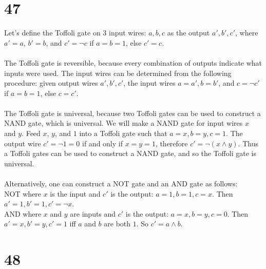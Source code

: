 \documentclass[letterpaper,notitlepage,twoside]{article}
\begin{document}
\section*{47}
Let's define the Toffoli gate on 3 input wires: $a, b, c$  as the output $a', b', c'$, where $a' = a$, $b' = b$, and $c' = \neg c$ if $a = b = 1$, else $c' = c$. \\\\
The Toffoli gate is reversible, because every combination of outputs indicate what inputs were used. The input wires can be determined from the following procedure: given output wires $a', b', c'$, the input wires $a = a', b = b'$, and $c = \neg c'$ if $a = b = 1$, else $c = c'$. \\\\
The Toffoli gate is universal, because two Toffoli gates can be used to construct a NAND gate, which is universal. We will make a NAND gate for input wires $x$ and $y$. Feed $x$, $y$, and $1$ into a Toffoli gate such that $a = x, b = y, c = 1$. The output wire $c' = \neg 1 = 0$ if and only if $x = y = 1$, therefore $c' = \neg (x \land y)$. Thus a Toffoli gates can be used to construct a NAND gate, and so the Toffoli gate is universal.\\\\
Alternatively, one can construct a NOT gate and an AND gate as follows:\\
NOT where $x$ is the input and $c'$ is the output: $a = 1, b = 1, c = x$. Then $a' = 1, b' = 1, c' = \neg x$.\\
AND where $x$ and $y$ are inputs and $c'$ is the output: $a = x, b = y, c = 0$. Then $a' = x, b' = y, c' = 1$ iff $a$ and $b$ are both $1$. So $c' = a \land b$.
\section*{48}
\end{document}
